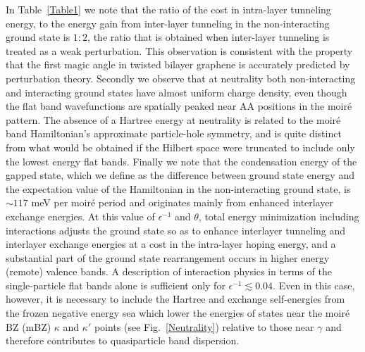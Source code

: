 \documentclass[aps,prl,reprint,amssymb,groupedaddress,twocolumn]{revtex4}
\begin{document}
In Table~\ref{Table1} we note that the ratio of the cost in intra-layer tunneling energy,
to the energy gain from inter-layer tunneling in the non-interacting ground state is $1:2$, the ratio
that is obtained when inter-layer tunneling is treated as a weak perturbation.  This observation is 
consistent with the property \cite{BMModel} that the first magic angle in twisted bilayer graphene is accurately 
predicted by perturbation theory.   Secondly we observe that at neutrality both non-interacting and interacting 
ground states have almost uniform charge density, even though the flat band wavefunctions are
spatially peaked near AA positions in the moir\'e pattern.  The absence of a Hartree energy 
at neutrality is related to the moir\'e band Hamiltonian's approximate 
particle-hole symmetry, and is quite distinct from what would be obtained 
if the Hilbert space were truncated to include only the lowest energy flat bands.
Finally we note that the condensation energy of the gapped state, which 
we define as the difference between ground state energy and the expectation 
value of the Hamiltonian in the non-interacting ground state, is 
$\sim 117$ meV per moir\'e period
and originates  mainly from enhanced interlayer exchange energies.  
At this value of $\epsilon^{-1}$ and $\theta$, total energy minimization including interactions adjusts the ground state 
so as to enhance interlayer tunneling and interlayer exchange energies at a cost in the intra-layer hoping energy,
and a substantial part of the ground state rearrangement occurs in higher energy (remote) valence bands.
A description of interaction physics in terms of the single-particle flat bands alone is sufficient only for $\epsilon^{-1} \lesssim 0.04$.
Even in this case, however, it is necessary to include the Hartree \cite{GuineaInteractions} and exchange self-energies from the frozen negative energy sea which 
lower the energies of states near the moir\'e BZ (mBZ) $\kappa$ and $\kappa'$ points (see Fig.~\ref{Neutrality}) relative to those near $\gamma$ and 
therefore contributes to quasiparticle band dispersion. 
\end{document}
